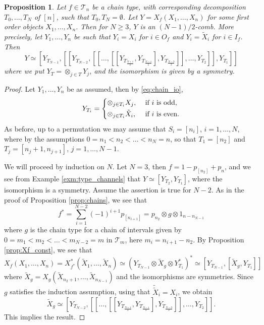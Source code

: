 \documentclass[12pt]{article}
\newtheorem{prop}{Proposition}
\theoremstyle{definition}
\theoremstyle{remark}
\def\Te{\mathcal T}
\begin{document}
\begin{prop}\label{prop:chains_combs}  Let $f\in \Te_n$ be a chain type, with
corresponding decomposition $T_0,\dots, T_{N}$ of $[n]$, such that 
$T_0,T_{N}=\emptyset$. Let $Y=X_f(X_1,\dots,X_n)$ for some first order objects $X_1,\dots, X_n$. 
Then for $N\ge 3$, $Y$ is an $(N-1)/2$-comb. 
More precisely, let $Y_1,\dots, Y_n$ be such that $Y_i=X_i$ for $i\in O_f$ and $Y_i=\tilde X_i$ for $i\in I_f$.
Then
\[
Y\simeq
[Y_{T_{N-1}},[[Y_{T_{N-2}},[[\dots,[[Y_{T_{\frac{N+1}2}},Y_{T_{\frac{N-1}2}}],Y_{T_{\frac{N-3}2}}]],\dots,Y_{T_2}]],Y_{T_1}]] 
 \]
 where we put $Y_T=\otimes_{j\in T} Y_j$, 
 and the isomorphism is given by a symmetry.

\end{prop}



\begin{proof} Let $Y_1,\dots,Y_n$ be as assumed, then  by \eqref{eq:chain_io}, 
\[
Y_{T_i}=\begin{dcases} \otimes_{j\in T_i}X_j,  & \text{ if } i\text{ is odd},\\
\otimes_{j\in T_i}\tilde X_i,& \text{ if }i\text{ is even}.
\end{dcases}
\]
As before, up to a permutation we may assume that $S_i=[n_i]$, $i=1,\dots, N$, where by
the assumptions
$0=n_1<n_2<\dots<n_N=n$, so that $T_1=[n_2]$ and $T_j=[n_j+1,n_{j+1}]$, $j=1,\dots, N-1$. 

We will proceed by induction on $N$.
Let $N=3$, then $f=1-p_{[n_2]}+p_{n}$, and we see from Example \ref{exm:type_channels}
that  $Y\simeq [Y_{T_2}, Y_{T_1}]$, where the isomorphism is a symmetry. 
Assume the assertion is true for  $N-2$.  As in the proof of Proposition \ref{prop:chains}, we see that 
\[
f^*=\sum_{i=1}^{N-2}(-1)^{i+1}p_{[n_{i+1}]}=p_{n_2}\otimes g\otimes 1_{n-n_{N-1}}
\]
where $g$ is the chain type for  a chain of intervals given by $0=m_1<m_2<\dots<m_{N-2}=m$ in $\Te_m$,
here $m_i=n_{i+1}-n_2$. By Proposition \ref{prop:Xf_const}, we see that 
\[
X_f(X_1,\dots,X_n)=X_{f^*}^*(\tilde X_1,\dots, \tilde X_n)\simeq (Y_{T_{N-1}}\otimes
\tilde X_g\otimes Y^*_{T_1})^*\simeq [Y_{T_{N-1}},[\tilde X_g,Y_{T_1}]]
\]
where $\tilde X_g=X_g(\tilde X_{n_2+1},\dots, \tilde X_{n_{N-1}})$ and the isomorphisms are
symmetries. Since $g$ satisfies the induction assumption, using that $\tilde {\tilde
X}_i=X_i$, we obtain 
\[
\tilde X_g\simeq
[Y_{T_{N-2}},[[\dots,[[Y_{T_{\frac{N+1}2}},Y_{T_{\frac{N-1}2}}],Y_{T_{\frac{N-3}2}}]],\dots,Y_{T_2}]].
\]
This implies the result.


\end{proof}
\end{document}
